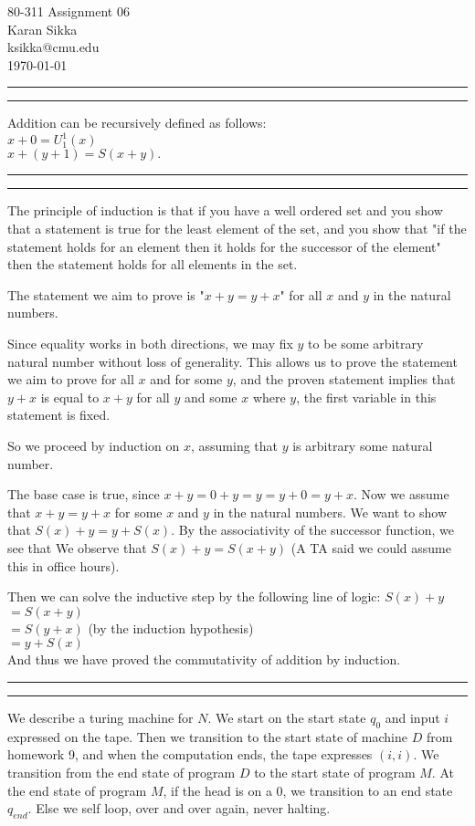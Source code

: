 \documentclass[11pt,letterpaper]{article}
\makeatletter
\newcommand{\question}[1] {\vspace{.25in} \hrule\vspace{0.5em}
\noindent{\bf #1} \vspace{0.5em}
\hrule \vspace{.10in}}
\newcommand{\myname}{Karan Sikka}
\newcommand{\myandrew}{ksikka@cmu.edu}
\newcommand{\myhwnum}{06}
\makeatother
\begin{document}
\medskip

\thispagestyle{plain}
\begin{center}                  %
{\Large 80-311 Assignment \myhwnum} \\
\myname \\
\myandrew \\
\today
\end{center}

\question{1.1}
Addition can be recursively defined as follows:\\
$x + 0 = U_1^1(x)$\\
$x + (y + 1) = S(x + y).$\\

\question{1.2}
The principle of induction is that if you have a well ordered set and you show that a statement is true for the least element of the set, and you show that "if the statement holds for an element then it holds for the successor of the element" then the statement holds for all elements in the set.

The statement we aim to prove is "$x + y = y + x$" for all $x$ and $y$ in the natural numbers.

Since equality works in both directions, we may fix $y$ to be some arbitrary natural number without loss of generality.
This allows us to prove the statement we aim to prove for all $x$ and for some $y$, and the proven statement implies that $y + x$ is equal to $x + y$ for all $y$ and some $x$ where $y$, the first variable in this statement is fixed.

So we proceed by induction on $x$, assuming that $y$ is arbitrary some natural number.

The base case is true, since $x + y = 0 + y = y = y + 0 = y + x$.
Now we assume that $x + y = y + x$ for some $x$ and $y$ in the natural numbers.
We want to show that $S(x) + y = y + S(x)$. By the associativity of the successor function, we see that
We observe that $S(x) + y = S(x + y)$ (A TA said we could assume this in office hours).

Then we can solve the inductive step by the following line of logic:
$S(x) + y$\\
$= S(x + y)$\\
$= S(y + x)$ (by the induction hypothesis)\\
$= y + S(x)$\\

And thus we have proved the commutativity of addition by induction.

\question{2}
We describe a turing machine for $N$.
We start on the start state $q_0$ and input $i$ expressed on the tape.
Then we transition to the start state of machine $D$ from homework 9, and when the
computation ends, the tape expresses $(i,i)$. We transition from the end state
of program $D$ to the start state of program $M$. At the end state of program $M$, if the head is on a $0$,
we transition to an end state $q_{end}$. Else we self loop, over and over again, never halting.
\end{document}

